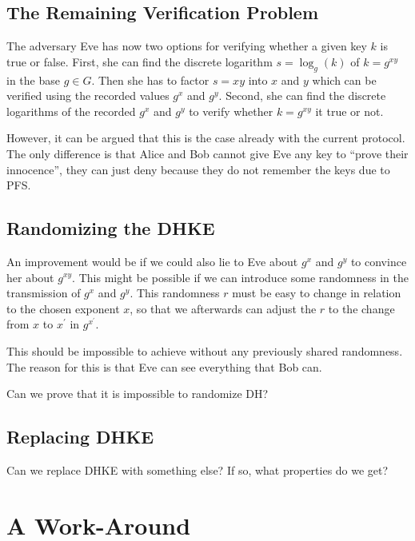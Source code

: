 \subsection{The Remaining Verification Problem}

The adversary Eve has now two options for verifying whether a given key \(k\) 
is true or false.
First, she can find the discrete logarithm \(s = \log_g( k )\) of \(k 
= g^{xy}\) in the base \(g\in G\).
Then she has to factor \(s = xy\) into \(x\) and \(y\) which can be verified 
using the recorded values \(g^x\) and \(g^y\).
Second, she can find the discrete logarithms of the recorded \(g^x\) and 
\(g^y\) to verify whether \(k = g^{xy}\) it true or not.

However, it can be argued that this is the case already with the current 
protocol.
The only difference is that Alice and Bob cannot give Eve any key to 
\enquote{prove their innocence}, they can just deny because they do not 
remember the keys due to \ac{PFS}.

\subsection{Randomizing the \acs{DHKE}}\label{sec:random}

An improvement would be if we could also lie to Eve about \(g^x\) and \(g^y\) 
to convince her about \(g^{xy}\).
This might be possible if we can introduce some randomness in the transmission 
of \(g^x\) and \(g^y\).
This randomness \(r\) must be easy to change in relation to the chosen exponent 
\(x\), so that we afterwards can adjust the \(r\) to the change from \(x\) to 
\(x^\prime\) in \(g^{x^\prime}\).

This should be impossible to achieve without any previously shared randomness.
The reason for this is that Eve can see everything that Bob can.

Can we prove that it is impossible to randomize \ac{DH}?

\subsection{Replacing \acs{DHKE}}

Can we replace \ac{DHKE} with something else?
If so, what properties do we get?


\section{A Work-Around}

